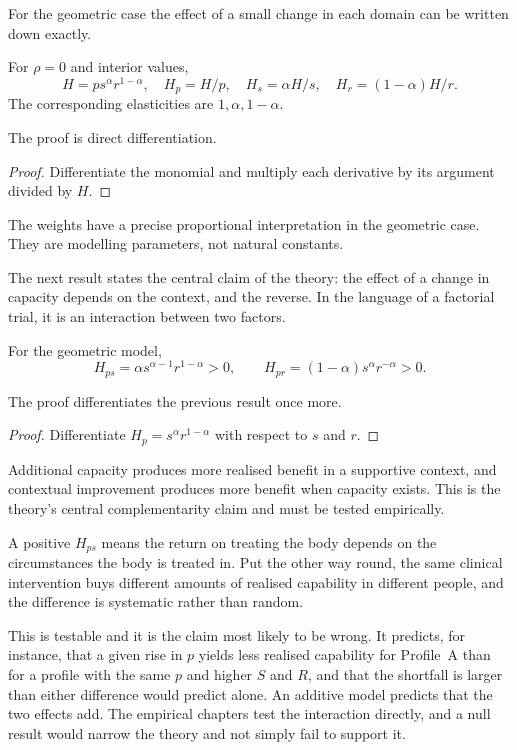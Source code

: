 For the geometric case the effect of a small change in each domain can be
written down exactly.

\begin{proposition}
For $\rho=0$ and interior values,
\[
H=ps^\alpha r^{1-\alpha},\quad
H_p=H/p,\quad H_s=\alpha H/s,\quad H_r=(1-\alpha)H/r.
\]
The corresponding elasticities are $1,\alpha,1-\alpha$.
\end{proposition}
The proof is direct differentiation.
\begin{proof}
Differentiate the monomial and multiply each derivative by its argument divided
by $H$.
\end{proof}

\begin{remark}
The weights have a precise proportional interpretation in the geometric case.
They are modelling parameters, not natural constants.
\end{remark}

The next result states the central claim of the theory: the effect of a
change in capacity depends on the context, and the reverse. In the language of
a factorial trial, it is an interaction between two factors.

\begin{proposition}
For the geometric model,
\[
H_{ps}=\alpha s^{\alpha-1}r^{1-\alpha}>0,\qquad
H_{pr}=(1-\alpha)s^\alpha r^{-\alpha}>0.
\]
\end{proposition}
The proof differentiates the previous result once more.
\begin{proof}
Differentiate $H_p=s^\alpha r^{1-\alpha}$ with respect to $s$ and $r$.
\end{proof}

\begin{remark}
Additional capacity produces more realised benefit in a supportive context,
and contextual improvement produces more benefit when capacity exists. This is
the theory's central complementarity claim and must be tested empirically.
\end{remark}

\begin{reading}
A positive $H_{ps}$ means the return on treating the body depends on the
circumstances the body is treated in. Put the other way round, the same
clinical intervention buys different amounts of realised capability in
different people, and the difference is systematic rather than random.

This is testable and it is the claim most likely to be wrong. It predicts, for
instance, that a given rise in $p$ yields less realised capability for
Profile~A than for a profile with the same $p$ and higher $S$ and $R$, and that
the shortfall is larger than either difference would predict alone. An additive
model predicts that the two effects add. The empirical
chapters test the interaction directly, and a null result would narrow the
theory and not simply fail to support it.
\end{reading}

